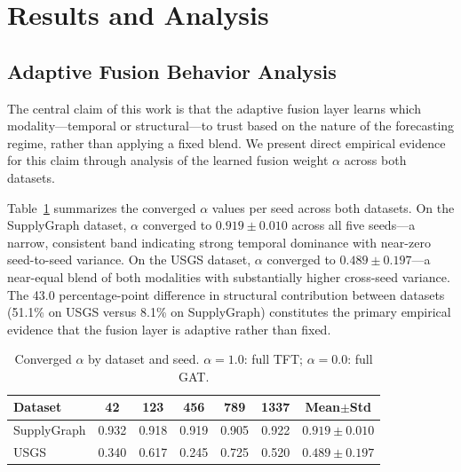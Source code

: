 
\section{Results and Analysis}

\subsection{Adaptive Fusion Behavior Analysis}

The central claim of this work is that the adaptive fusion layer learns
which modality---temporal or structural---to trust based on the nature
of the forecasting regime, rather than applying a fixed blend.
We present direct empirical evidence for this claim through analysis
of the learned fusion weight $\alpha$ across both datasets.

Table~\ref{tab:alpha_fusion} summarizes the converged $\alpha$ values
per seed across both datasets. On the SupplyGraph dataset, $\alpha$
converged to $0.919 \pm 0.010$ across all five seeds---a narrow,
consistent band indicating strong temporal dominance with near-zero
seed-to-seed variance. On the USGS dataset, $\alpha$ converged to
$0.489 \pm 0.197$---a near-equal blend of both modalities with
substantially higher cross-seed variance. The 43.0 percentage-point
difference in structural contribution between datasets (51.1\% on USGS
versus 8.1\% on SupplyGraph) constitutes the primary empirical evidence
that the fusion layer is adaptive rather than fixed.

\begin{table}[!t]
\caption{Converged $\alpha$ by dataset and seed. $\alpha{=}1.0$: full
TFT; $\alpha{=}0.0$: full GAT.}
\label{tab:alpha_fusion}
\centering\small
\begin{tabular}{lcccccc}
\hline
Dataset & 42 & 123 & 456 & 789 & 1337 & Mean$\pm$Std \\
\hline
SupplyGraph & 0.932 & 0.918 & 0.919 & 0.905 & 0.922 & $0.919{\pm}0.010$ \\
USGS        & 0.340 & 0.617 & 0.245 & 0.725 & 0.520 & $0.489{\pm}0.197$ \\
\hline
\end{tabular}
\end{table}

